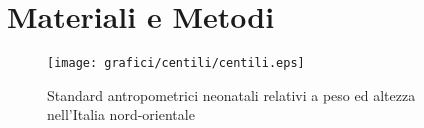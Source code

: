 \chapter{Materiali e Metodi}

%
\begin{figure}[h]
  \begin{center}
      \texttt{[image: grafici/centili/centili.eps]} %
  \end{center}
  \caption{Standard antropometrici neonatali relativi a peso ed altezza nell'Italia nord-orientale}
\end{figure}
